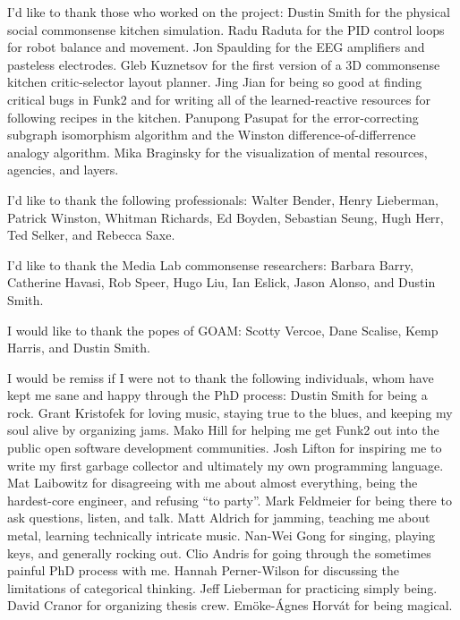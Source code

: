 \noindent I'd like to thank those who worked on the project:
Dustin Smith for the physical social commonsense kitchen simulation.
Radu Raduta for the PID control loops for robot balance and movement.
Jon Spaulding for the EEG amplifiers and pasteless electrodes.
Gleb Kuznetsov for the first version of a 3D commonsense kitchen critic-selector layout planner.
Jing Jian for being so good at finding critical bugs in Funk2 and for writing all of the learned-reactive resources for following recipes in the kitchen.
Panupong Pasupat for the error-correcting subgraph isomorphism algorithm and the Winston difference-of-differrence analogy algorithm.
Mika Braginsky for the visualization of mental resources, agencies, and layers.

\vspace{5mm}

\noindent I'd like to thank the following professionals:
Walter Bender,
Henry Lieberman,
Patrick Winston,
Whitman Richards,
Ed Boyden,
Sebastian Seung,
Hugh Herr,
Ted Selker, and
Rebecca Saxe.

\vspace{5mm}

\noindent I'd like to thank the Media Lab commonsense researchers:
Barbara Barry,
Catherine Havasi,
Rob Speer,
Hugo Liu,
Ian Eslick,
Jason Alonso, and
Dustin Smith.

\vspace{5mm}

\noindent I would like to thank the popes of GOAM:
Scotty Vercoe,
Dane Scalise,
Kemp Harris, and
Dustin Smith.

\vspace{5mm}

\noindent I would be remiss if I were not to thank the following individuals,
whom have kept me sane and happy through the PhD process:
Dustin Smith for being a rock.
Grant Kristofek for loving music, staying true to the blues, and keeping my soul alive by organizing jams.
Mako Hill for helping me get Funk2 out into the public open software development communities.
Josh Lifton for inspiring me to write my first garbage collector and ultimately my own programming language.
Mat Laibowitz for disagreeing with me about almost everything, being the hardest-core engineer, and refusing ``to party''.
Mark Feldmeier for being there to ask questions, listen, and talk.
Matt Aldrich for jamming, teaching me about metal, learning technically intricate music.
Nan-Wei Gong for singing, playing keys, and generally rocking out.
Clio Andris for going through the sometimes painful PhD process with me.
Hannah Perner-Wilson for discussing the limitations of categorical thinking.
Jeff Lieberman for practicing simply being.
David Cranor for organizing thesis crew.
Em\"{o}ke-\'{A}gnes Horv\'{a}t for being magical.

\endgroup

